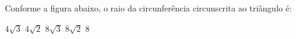 Conforme a figura abaixo, o raio da circunfer\^encia circunscrita ao tri\^angulo \'e:

\parbox{0.24\linewidth}{

$4\sqrt{3}$
$4\sqrt{2}$
$8\sqrt{3}$
$8\sqrt{2}$
$8$

}\parbox{0.75\linewidth}{
\begin{center}
\vspace{-6mm}
\vspace{-6mm}
\end{center}
}


